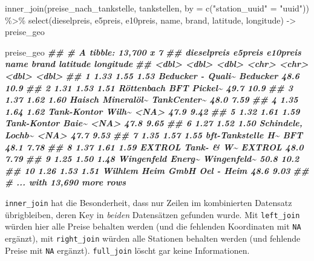 \documentclass[11pt,german,a4paper]{article}
\newenvironment{Shaded}{\begin{snugshade}}{\end{snugshade}}
\newcommand{\AttributeTok}[1]{\textcolor[rgb]{0.77,0.63,0.00}{#1}}
\newcommand{\DocumentationTok}[1]{\textcolor[rgb]{0.56,0.35,0.01}{\textbf{\textit{#1}}}}
\newcommand{\FunctionTok}[1]{\textcolor[rgb]{0.00,0.00,0.00}{#1}}
\newcommand{\NormalTok}[1]{#1}
\newcommand{\OtherTok}[1]{\textcolor[rgb]{0.56,0.35,0.01}{#1}}
\newcommand{\SpecialCharTok}[1]{\textcolor[rgb]{0.00,0.00,0.00}{#1}}
\newcommand{\StringTok}[1]{\textcolor[rgb]{0.31,0.60,0.02}{#1}}
\begin{document}
\begin{Shaded}
\begin{Highlighting}[]
\FunctionTok{inner\_join}\NormalTok{(preise\_nach\_tankstelle, tankstellen,}
           \AttributeTok{by =} \FunctionTok{c}\NormalTok{(}\StringTok{"station\_uuid"} \OtherTok{=} \StringTok{"uuid"}\NormalTok{)) }\SpecialCharTok{\%\textgreater{}\%}
  \FunctionTok{select}\NormalTok{(dieselpreis, e5preis, e10preis, name, brand, latitude, longitude) }\OtherTok{{-}\textgreater{}}
\NormalTok{  preise\_geo}

\NormalTok{preise\_geo}
\DocumentationTok{\#\# \# A tibble: 13,700 x 7}
\DocumentationTok{\#\#    dieselpreis e5preis e10preis name              brand       latitude longitude}
\DocumentationTok{\#\#          \textless{}dbl\textgreater{}   \textless{}dbl\textgreater{}    \textless{}dbl\textgreater{} \textless{}chr\textgreater{}             \textless{}chr\textgreater{}          \textless{}dbl\textgreater{}     \textless{}dbl\textgreater{}}
\DocumentationTok{\#\#  1        1.33    1.55     1.53 Beducker {-} Quali\textasciitilde{} Beducker        48.6     10.9 }
\DocumentationTok{\#\#  2        1.31    1.53     1.51 Röttenbach        BFT Pickel\textasciitilde{}     49.7     10.9 }
\DocumentationTok{\#\#  3        1.37    1.62     1.60 Haisch Mineralöl\textasciitilde{} TankCenter\textasciitilde{}     48.0      7.59}
\DocumentationTok{\#\#  4        1.35    1.64     1.62 Tank{-}Kontor Wilh\textasciitilde{} \textless{}NA\textgreater{}            47.9      9.42}
\DocumentationTok{\#\#  5        1.32    1.61     1.59 Tank{-}Kontor Baie\textasciitilde{} \textless{}NA\textgreater{}            47.8      9.65}
\DocumentationTok{\#\#  6        1.27    1.52     1.50 Schindele, Lochb\textasciitilde{} \textless{}NA\textgreater{}            47.7      9.53}
\DocumentationTok{\#\#  7        1.35    1.57     1.55 bft{-}Tankstelle H\textasciitilde{} BFT             48.1      7.78}
\DocumentationTok{\#\#  8        1.37    1.61     1.59 EXTROL Tank{-} \& W\textasciitilde{} EXTROL          48.0      7.79}
\DocumentationTok{\#\#  9        1.25    1.50     1.48 Wingenfeld Energ\textasciitilde{} Wingenfeld\textasciitilde{}     50.8     10.2 }
\DocumentationTok{\#\# 10        1.26    1.53     1.51 Wilhlem Heim GmbH Oel {-} Heim      48.6      9.03}
\DocumentationTok{\#\# \# ... with 13,690 more rows}
\end{Highlighting}
\end{Shaded}

\texttt{inner\_join} hat die Besonderheit, dass nur Zeilen im kombinierten Datensatz übrigbleiben, deren Key in \emph{beiden} Datensätzen gefunden wurde. Mit \texttt{left\_join} würden hier alle Preise behalten werden (und die fehlenden Koordinaten mit \texttt{NA} ergänzt), mit \texttt{right\_join} würden alle Stationen behalten werden (und fehlende Preise mit \texttt{NA} ergänzt). \texttt{full\_join} löscht gar keine Informationen.
\end{document}
